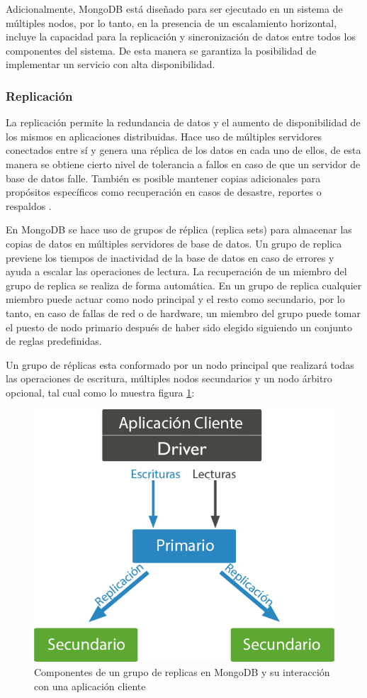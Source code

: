 Adicionalmente, MongoDB \cite{10} está diseñado para ser ejecutado en un sistema de múltiples nodos, por lo tanto,
en la presencia de un escalamiento horizontal, incluye la capacidad para la replicación
y sincronización de datos entre todos los componentes del sistema. De esta manera se garantiza la posibilidad
de implementar un servicio con alta disponibilidad.

\subsubsection{Replicación}

La replicación permite la redundancia de datos y el aumento de disponibilidad de los mismos en aplicaciones distribuidas.
Hace uso de múltiples servidores conectados entre sí y genera una réplica de los datos en cada uno de ellos, de
esta manera se obtiene cierto nivel de tolerancia a fallos en caso de que un servidor de base de datos falle.
También es posible mantener copias adicionales para propósitos específicos como recuperación en casos de desastre,
reportes o respaldos \cite{11}.

En MongoDB se hace uso de grupos de réplica (replica sets) para almacenar las copias de datos en múltiples
servidores de base de datos. Un grupo de replica previene los tiempos de inactividad de la base de datos
en caso de errores y ayuda a escalar las operaciones de lectura. La recuperación de un miembro del grupo de
replica se realiza de forma automática. En un grupo de replica cualquier miembro puede actuar como nodo principal
y el resto como secundario, por lo tanto, en caso de fallas de red o de hardware, un miembro del grupo
puede tomar el puesto de nodo primario después de haber sido elegido siguiendo un conjunto de reglas predefinidas.

Un grupo de réplicas esta conformado por un nodo principal que realizará todas las operaciones de escritura, múltiples nodos
secundarios y un nodo árbitro opcional, tal cual como lo muestra figura \ref{fig:replicas}:

\begin{figure}[H]
	\centering
		\includegraphics[width=.6\textwidth]{figures/replicas}
	\caption{Componentes de un grupo de replicas en MongoDB y su interacción con una aplicación cliente}
	\label{fig:replicas}
\end{figure}

